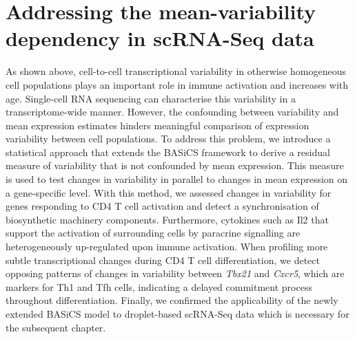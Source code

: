 
\chapter{Addressing the mean-variability dependency in scRNA-Seq data}  

\graphicspath{{"../../Dropbox (Cambridge  University)/Figures_for_thesis/Chapter2/"}}

\vfill

\begin{Abstract}
\hspace{-5mm} As shown above, cell-to-cell transcriptional variability in otherwise homogeneous cell populations plays an important role in immune activation and increases with age. Single-cell RNA sequencing can characterise this variability in a transcriptome-wide manner. However, the confounding between variability and mean expression estimates hinders meaningful comparison of expression variability between cell populations. To address this problem, we introduce a statistical approach that extends the BASiCS framework to derive a residual measure of variability that is not confounded by mean expression. This measure is used to test changes in variability in parallel to changes in mean expression on a gene-specific level. With this method, we assessed changes in variability for genes responding to CD4\plus{} T cell activation and detect a synchronisation of biosynthetic machinery components. Furthermore, cytokines such as Il2 that support the activation of surrounding cells by paracrine signalling are heterogeneously up-regulated upon immune activation. When profiling more subtle transcriptional changes during CD4\plus{} T cell differentiation, we detect opposing patterns of changes in variability between \textit{Tbx21} and \textit{Cxcr5}, which are markers for Th1 and Tfh cells, indicating a delayed commitment process throughout differentiation. Finally, we confirmed the applicability of the newly extended BASiCS model to droplet-based scRNA-Seq data which is necessary for the subsequent chapter.
\end{Abstract}

\vfill

\newpage

